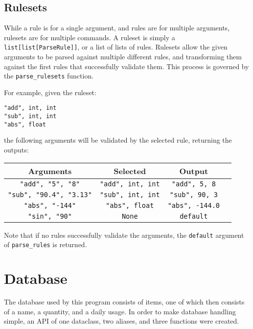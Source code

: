 \documentclass{article}
\begin{document}
		\subsection{Rulesets}
			While a rule is for a single argument, and rules are for multiple arguments, rulesets
			are for multiple commands. A ruleset is simply a \verb|list[list[ParseRule]]|, or a
			list of lists of rules. Rulesets allow the given arguments to be parsed against
			multiple different rules, and transforming them against the first rules that
			successfully validate them. This process is governed by the \verb|parse_rulesets|
			function.

			For example, given the ruleset:

			\begin{center}
				\verb|"add", int, int| \\
				\verb|"sub", int, int| \\
				\verb|"abs", float|    \\
			\end{center}

			the following arguments will be validated by the selected rule, returning the outputs:

			\begin{center}
				\begin{tabular}{|c|c|c|c|}
					\hline
					Arguments & Selected & Output
					\\ \hline
						\verb|"add", "5", "8"| &
						\verb|"add", int, int| &
						\verb|"add", 5, 8|
					\\ \hline
						\verb|"sub", "90.4", "3.13"| &
						\verb|"sub", int, int| &
						\verb|"sub", 90, 3|
					\\ \hline
						\verb|"abs", "-144"| &
						\verb|"abs", float| &
						\verb|"abs", -144.0|
					\\ \hline
						\verb|"sin", "90"| &
						\verb|None| &
						\verb|default|
					\\ \hline
				\end{tabular}
			\end{center}

			Note that if no rules successfully validate the arguments, the \verb|default| argument of
			\verb|parse_rules| is returned.

		\pagebreak

	\section{Database}
		The database used by this program consists of items, one of which then consists of a name,
		a quantity, and a daily usage. In order to make database handling simple, an API of one
		dataclass, two aliases, and three functions were created.
\end{document}
